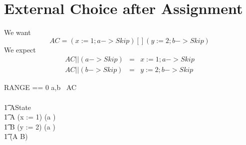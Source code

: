 \section{External Choice after Assignment}

We want
\[
  AC = ( x:=1 ; a -> Skip ) [] (y:=2 ; b -> Skip)
\]
We expect
\begin{eqnarray}
   AC || (a -> Skip)  &=&  x:=1 ; a -> Skip
\\ AC || (b -> Skip)  &=&  y:=2 ; b -> Skip
\end{eqnarray}

\begin{circus}
RANGE == 0 
\also \circchannel a,b
\also
\circprocess\ AC \circdef\\
\circbegin\\
\t1 \circstate AState \\
\t1 A \circdef (x := 1) \circseq (a \then \Skip) \\
\t1 B \circdef (y := 2) \circseq (a \then \Skip) \\
\t1 \circspot (A \extchoice B)\\
\circend
\end{circus}
